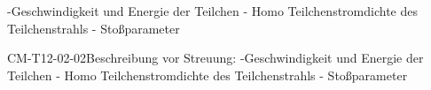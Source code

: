 -Geschwindigkeit und Energie der Teilchen
- Homo Teilchenstromdichte des Teilchenstrahls
- Stoßparameter

\begin{DEF}{CM-T12-02-02}{Beschreibung vor Streuung:
-Geschwindigkeit und Energie der Teilchen
- Homo Teilchenstromdichte des Teilchenstrahls
- Stoßparameter}
\end{DEF}
